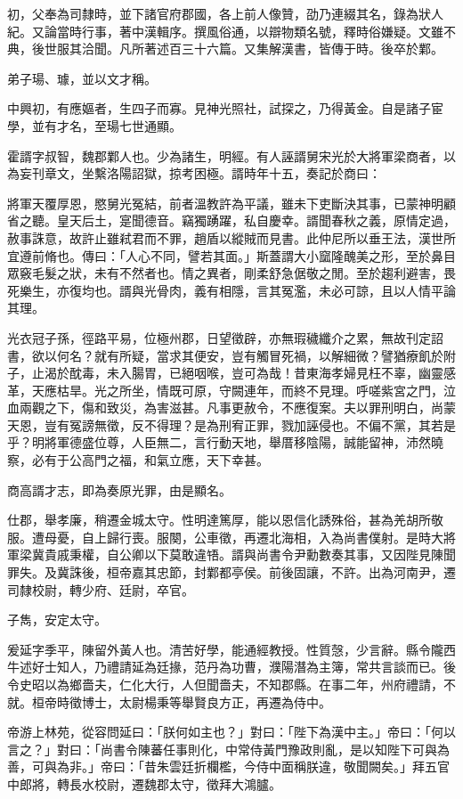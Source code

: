 \begin{pinyinscope}
初，父奉為司隸時，並下諸官府郡國，各上前人像贊，劭乃連綴其名，錄為狀人紀。又論當時行事，著中漢輯序。撰風俗通，以辯物類名號，釋時俗嫌疑。文雖不典，後世服其洽聞。凡所著述百三十六篇。又集解漢書，皆傳于時。後卒於鄴。

弟子瑒、璩，並以文才稱。

中興初，有應嫗者，生四子而寡。見神光照社，試探之，乃得黃金。自是諸子宦學，並有才名，至瑒七世通顯。

霍諝字叔智，魏郡鄴人也。少為諸生，明經。有人誣諝舅宋光於大將軍梁商者，以為妄刊章文，坐繫洛陽詔獄，掠考困極。諝時年十五，奏記於商曰：

將軍天覆厚恩，愍舅光冤結，前者溫教許為平議，雖未下吏斷決其事，已蒙神明顧省之聽。皇天后土，寔聞德音。竊獨踴躍，私自慶幸。諝聞春秋之義，原情定過，赦事誅意，故許止雖弒君而不罪，趙盾以縱賊而見書。此仲尼所以垂王法，漢世所宜遵前脩也。傳曰：「人心不同，譬若其面。」斯蓋謂大小窳隆醜美之形，至於鼻目眾竅毛髮之狀，未有不然者也。情之異者，剛柔舒急倨敬之閒。至於趨利避害，畏死樂生，亦復均也。諝與光骨肉，義有相隱，言其冤濫，未必可諒，且以人情平論其理。

光衣冠子孫，徑路平易，位極州郡，日望徵辟，亦無瑕穢纖介之累，無故刊定詔書，欲以何名？就有所疑，當求其便安，豈有觸冒死禍，以解細微？譬猶療飢於附子，止渴於酖毒，未入腸胃，已絕咽喉，豈可為哉！昔東海孝婦見枉不辜，幽靈感革，天應枯旱。光之所坐，情既可原，守闕連年，而終不見理。呼嗟紫宮之門，泣血兩觀之下，傷和致災，為害滋甚。凡事更赦令，不應復案。夫以罪刑明白，尚蒙天恩，豈有冤謗無徵，反不得理？是為刑宥正罪，戮加誣侵也。不偏不黨，其若是乎？明將軍德盛位尊，人臣無二，言行動天地，舉厝移陰陽，誠能留神，沛然曉察，必有于公高門之福，和氣立應，天下幸甚。

商高諝才志，即為奏原光罪，由是顯名。

仕郡，舉孝廉，稍遷金城太守。性明達篤厚，能以恩信化誘殊俗，甚為羌胡所敬服。遭母憂，自上歸行喪。服闋，公車徵，再遷北海相，入為尚書僕射。是時大將軍梁冀貴戚秉權，自公卿以下莫敢違啎。諝與尚書令尹勳數奏其事，又因陛見陳聞罪失。及冀誅後，桓帝嘉其忠節，封鄴都亭侯。前後固讓，不許。出為河南尹，遷司隸校尉，轉少府、廷尉，卒官。

子雋，安定太守。

爰延字季平，陳留外黃人也。清苦好學，能通經教授。性質愨，少言辭。縣令隴西牛述好士知人，乃禮請延為廷掾，范丹為功曹，濮陽潛為主簿，常共言談而已。後令史昭以為鄉嗇夫，仁化大行，人但聞嗇夫，不知郡縣。在事二年，州府禮請，不就。桓帝時徵博士，太尉楊秉等舉賢良方正，再遷為侍中。

帝游上林苑，從容問延曰：「朕何如主也？」對曰：「陛下為漢中主。」帝曰：「何以言之？」對曰：「尚書令陳蕃任事則化，中常侍黃門豫政則亂，是以知陛下可與為善，可與為非。」帝曰：「昔朱雲廷折欄檻，今侍中面稱朕違，敬聞闕矣。」拜五官中郎將，轉長水校尉，遷魏郡太守，徵拜大鴻臚。


\end{pinyinscope}
